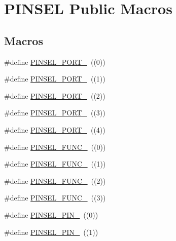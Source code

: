 \hypertarget{group___p_i_n_s_e_l___public___macros}{}\section{P\+I\+N\+S\+EL Public Macros}
\label{group___p_i_n_s_e_l___public___macros}
\subsection*{Macros}
\begin{DoxyCompactItemize}
\item 
\#define \hyperlink{group___p_i_n_s_e_l___public___macros_ga6be60e77a74899c8c3050a5c7154765a}{P\+I\+N\+S\+E\+L\+\_\+\+P\+O\+R\+T\+\_}~((0))
\item 
\#define \hyperlink{group___p_i_n_s_e_l___public___macros_gaaba832d2345e3a06cf0cdb1ae0d43999}{P\+I\+N\+S\+E\+L\+\_\+\+P\+O\+R\+T\+\_}~((1))
\item 
\#define \hyperlink{group___p_i_n_s_e_l___public___macros_ga55f9eb45dba730f6d830777fbab15a72}{P\+I\+N\+S\+E\+L\+\_\+\+P\+O\+R\+T\+\_}~((2))
\item 
\#define \hyperlink{group___p_i_n_s_e_l___public___macros_ga43b2bbfbf55bdd716e4d1443ad072bd1}{P\+I\+N\+S\+E\+L\+\_\+\+P\+O\+R\+T\+\_}~((3))
\item 
\#define \hyperlink{group___p_i_n_s_e_l___public___macros_ga5d5da051e602bac852b777c4d9491776}{P\+I\+N\+S\+E\+L\+\_\+\+P\+O\+R\+T\+\_}~((4))
\item 
\#define \hyperlink{group___p_i_n_s_e_l___public___macros_ga52e96a68181b78213b671c5fe8d60d33}{P\+I\+N\+S\+E\+L\+\_\+\+F\+U\+N\+C\+\_}~((0))
\item 
\#define \hyperlink{group___p_i_n_s_e_l___public___macros_gaf39d280a01f6c478d2a16996310c8754}{P\+I\+N\+S\+E\+L\+\_\+\+F\+U\+N\+C\+\_}~((1))
\item 
\#define \hyperlink{group___p_i_n_s_e_l___public___macros_ga658a961b569678308932fbdd1d5957c3}{P\+I\+N\+S\+E\+L\+\_\+\+F\+U\+N\+C\+\_}~((2))
\item 
\#define \hyperlink{group___p_i_n_s_e_l___public___macros_ga5a5529a534b46ba5e033fadd16307033}{P\+I\+N\+S\+E\+L\+\_\+\+F\+U\+N\+C\+\_}~((3))
\item 
\#define \hyperlink{group___p_i_n_s_e_l___public___macros_ga4cfdfb0d67ab68ce0c9b942b451a072b}{P\+I\+N\+S\+E\+L\+\_\+\+P\+I\+N\+\_}~((0))
\item 
\#define \hyperlink{group___p_i_n_s_e_l___public___macros_gaab8dd29478207b88054c7069d7cbdddf}{P\+I\+N\+S\+E\+L\+\_\+\+P\+I\+N\+\_}~((1))

\end{DoxyCompactItemize}
